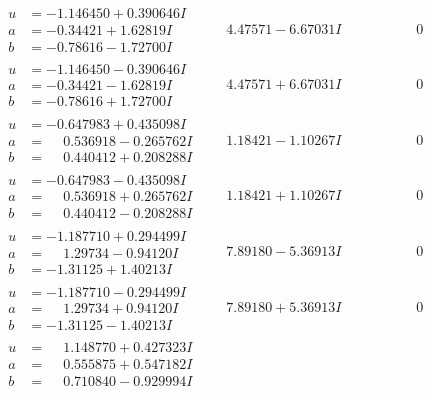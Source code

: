 \documentclass[1p]{elsarticle_modified}
\theoremstyle{definition}
\begin{document}
$$\begin{array}{c|c|c}
\begin{aligned}
u &= -1.146450 + 0.390646 I \\
a &= -0.34421 + 1.62819 I \\
b &= -0.78616 - 1.72700 I\end{aligned}
 & \phantom{-}4.47571 - 6.67031 I & \phantom{-0.000000 } 0 \\ \hline\begin{aligned}
u &= -1.146450 - 0.390646 I \\
a &= -0.34421 - 1.62819 I \\
b &= -0.78616 + 1.72700 I\end{aligned}
 & \phantom{-}4.47571 + 6.67031 I & \phantom{-0.000000 } 0 \\ \hline\begin{aligned}
u &= -0.647983 + 0.435098 I \\
a &= \phantom{-}0.536918 - 0.265762 I \\
b &= \phantom{-}0.440412 + 0.208288 I\end{aligned}
 & \phantom{-}1.18421 - 1.10267 I & \phantom{-0.000000 } 0 \\ \hline\begin{aligned}
u &= -0.647983 - 0.435098 I \\
a &= \phantom{-}0.536918 + 0.265762 I \\
b &= \phantom{-}0.440412 - 0.208288 I\end{aligned}
 & \phantom{-}1.18421 + 1.10267 I & \phantom{-0.000000 } 0 \\ \hline\begin{aligned}
u &= -1.187710 + 0.294499 I \\
a &= \phantom{-}1.29734 - 0.94120 I \\
b &= -1.31125 + 1.40213 I\end{aligned}
 & \phantom{-}7.89180 - 5.36913 I & \phantom{-0.000000 } 0 \\ \hline\begin{aligned}
u &= -1.187710 - 0.294499 I \\
a &= \phantom{-}1.29734 + 0.94120 I \\
b &= -1.31125 - 1.40213 I\end{aligned}
 & \phantom{-}7.89180 + 5.36913 I & \phantom{-0.000000 } 0 \\ \hline\begin{aligned}
u &= \phantom{-}1.148770 + 0.427323 I \\
a &= \phantom{-}0.555875 + 0.547182 I \\
b &= \phantom{-}0.710840 - 0.929994 I\end{aligned}

\end{array}$$
\end{document}
